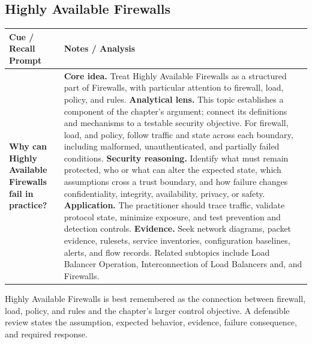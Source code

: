 \documentclass[11pt]{article}
\newcommand{\CornellHeader}{%
\rowcolor{Navy}\color{white}\bfseries Cue / Recall Prompt & \color{white}\bfseries Notes / Analysis\\\hline}
\newcommand{\CornellRow}[2]{%
\cellcolor{CueGray}\RaggedRight\textbf{#1} & \RaggedRight #2\\\hline}
\begin{document}
\subsection*{Highly Available Firewalls}
\begin{longtable}{>{\RaggedRight\arraybackslash}p{}|>{\RaggedRight\arraybackslash}p{}}
\CornellHeader
\CornellRow{Why can Highly Available Firewalls fail in practice?}{\textbf{Core idea.} Treat Highly Available Firewalls as a structured part of Firewalls, with particular attention to firewall, load, policy, and rules. \textbf{Analytical lens.} This topic establishes a component of the chapter's argument; connect its definitions and mechanisms to a testable security objective. For firewall, load, and policy, follow traffic and state across each boundary, including malformed, unauthenticated, and partially failed conditions. \textbf{Security reasoning.} Identify what must remain protected, who or what can alter the expected state, which assumptions cross a trust boundary, and how failure changes confidentiality, integrity, availability, privacy, or safety. \textbf{Application.} The practitioner should trace traffic, validate protocol state, minimize exposure, and test prevention and detection controls. \textbf{Evidence.} Seek network diagrams, packet evidence, rulesets, service inventories, configuration baselines, alerts, and flow records. Related subtopics include Load Balancer Operation, Interconnection of Load Balancers and, and Firewalls.}
\end{longtable}
\begin{topicsummary}
Highly Available Firewalls is best remembered as the connection between firewall, load, policy, and rules and the chapter's larger control objective. A defensible review states the assumption, expected behavior, evidence, failure consequence, and required response.
\end{topicsummary}
\end{document}
